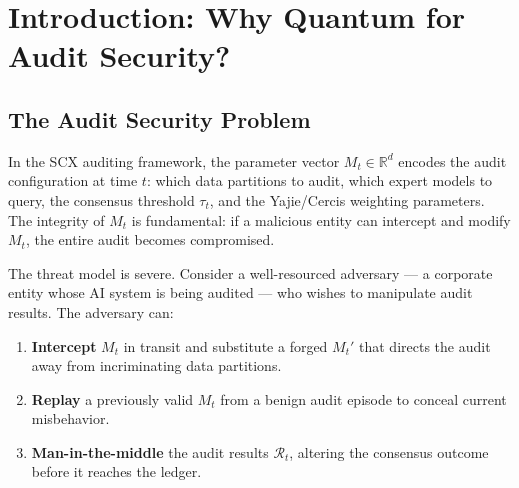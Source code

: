 \documentclass[11pt,a4paper]{article}
\theoremstyle{plain}
\theoremstyle{definition}
\theoremstyle{remark}
\newcommand{\R}{\mathbb{R}}
\newcommand{\Mt}{M_t}
\newcommand{\AuditResult}{\mathcal{R}}
\begin{document}
\begin{abstract}
\textbf{(4) Practical Feasibility} (Section~\ref{sec:practical}): We analyze
hardware requirements, existing quantum network infrastructure, and a phased
deployment roadmap. We conclude that while full quantum-secured audit is not
yet deployable at scale, a hybrid classical-quantum approach using
quantum-resistant post-quantum cryptography (CRYSTALS-Kyber) combined with
entanglement-based timestamping is feasible today.

\vspace{4pt}
\noindent\textbf{Keywords:} quantum key distribution, BB84, audit security,
entanglement, quantum channel capacity, SCX, tamper-proof auditing,
information-theoretic security
\end{abstract}

\tableofcontents

\section{Introduction: Why Quantum for Audit Security?}
\label{sec:intro}
\setcounter{page}{1}

\subsection{The Audit Security Problem}
\label{sec:intro_problem}

In the SCX auditing framework, the parameter vector $\Mt \in \R^d$ encodes the
audit configuration at time $t$: which data partitions to audit, which expert
models to query, the consensus threshold $\tau_t$, and the Yajie/Cercis
weighting parameters. The integrity of $\Mt$ is fundamental: if a malicious
entity can intercept and modify $\Mt$, the entire audit becomes compromised.

The threat model is severe. Consider a well-resourced adversary — a corporate
entity whose AI system is being audited — who wishes to manipulate audit results.
The adversary can:

\begin{enumerate}[label=(\roman*)]
  \item \textbf{Intercept} $\Mt$ in transit and substitute a forged $\Mt'$
        that directs the audit away from incriminating data partitions.
  \item \textbf{Replay} a previously valid $\Mt$ from a benign audit episode
        to conceal current misbehavior.
  \item \textbf{Man-in-the-middle} the audit results $\AuditResult_t$,
        altering the consensus outcome before it reaches the ledger.
\end{enumerate}
\end{document}
